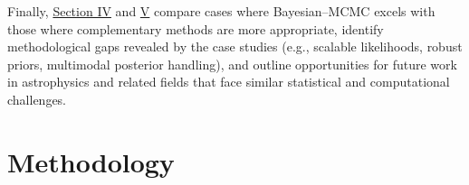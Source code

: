 \documentclass[preprint2,longauthor]{aastex631}
\begin{document}
Finally, \hyperref[placeholder]{Section IV} and \hyperref[placeholder]{V} compare cases where Bayesian–MCMC excels with those where complementary methods are more appropriate, identify methodological gaps revealed by the case studies (e.g., scalable likelihoods, robust priors, multimodal posterior handling), and outline opportunities for future work in astrophysics and related fields that face similar statistical and computational challenges.

\section{Methodology}
\label{sec:Methodology}



\end{document}
